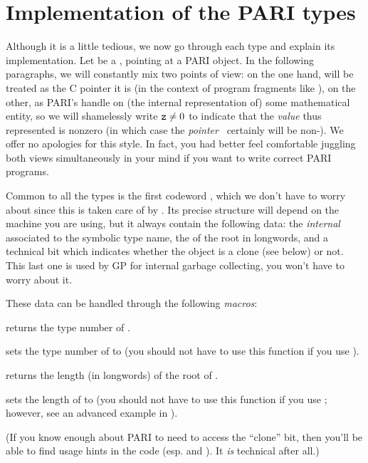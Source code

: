 \section{Implementation of the PARI types}
\label{se:impl}

\noindent
Although it is a little tedious, we now go through each type and explain its
implementation. Let  be a , pointing at a PARI object. In
the following paragraphs, we will constantly mix two points of view: on the
one hand,  will be treated as the C pointer it is (in the context of
program fragments like ), on the other, as PARI's handle on (the
internal representation of) some mathematical entity, so we will shamelessly
write ${\tt z} \ne 0$ to indicate that the {\it value\/} thus represented
is nonzero (in which case the {\it pointer\/}~ certainly will be
non-). We offer no apologies for this style. In fact, you had
better feel comfortable juggling both views simultaneously in your mind if
you want to write correct PARI programs.

Common to all the types is the
first codeword , which we don't have to worry about since this is
taken care of by . Its precise structure will depend on the
machine you are using, but it always contain the following data: the
{\it internal \/} associated to the symbolic type name, the
{\it{}\/} of the root in longwords, and a technical bit which
indicates whether the object is a clone (see below) or not. This last one is
used by GP for internal garbage collecting, you won't have to worry about it.

\noindent These data can be handled through the following {\it macros\/}:

 returns the type number of .

 sets the type number of  to
 (you should not have to use this function if you use ).

 returns the length (in longwords) of the root of .

 sets the length of  to  (you
should not have to use this function if you use ; however, see
an advanced example in ).

\noindent
(If you know enough about PARI to need to access the ``clone'' bit, then you'll
be able to find usage hints in the code (esp.  and
). It {\it is\/} technical after all.)

